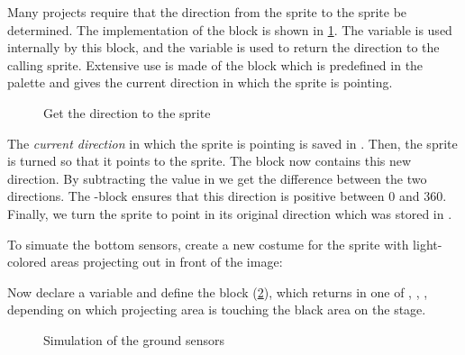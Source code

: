 
Many projects require that the direction from the  sprite to
the  sprite be determined. The implementation of the block
 is shown in \cref{fig.get-dir}.
The variable  is used internally
by this block, and the variable  is
used to return the direction to the calling sprite. Extensive use is
made of the block  which is predefined in the
 palette and gives the current direction in which the sprite
is pointing.

\begin{figure}[htb]
\caption{Get the direction to the  sprite}\label{fig.get-dir}
\end{figure}

The \emph{current direction} in which the sprite is pointing is saved in
. Then, the  sprite is turned so that it
points to the  sprite. The block  now
contains this new direction. By subtracting the value in
 we get the difference between the two directions. The
-block ensures that this direction is positive between 0 and 360.
Finally, we turn the  sprite to point in its original
direction which was stored in .



To simuate the bottom sensors, create a new costume for the 
sprite with light-colored areas projecting out in front of the image:


Now declare a variable  and define the block
 (\cref{fig.get-touching}), which returns in
 one of , , , 
depending on which projecting area is touching the black area on the
stage.

\begin{figure}
\caption{Simulation of the ground sensors}\label{fig.get-touching}
\end{figure}